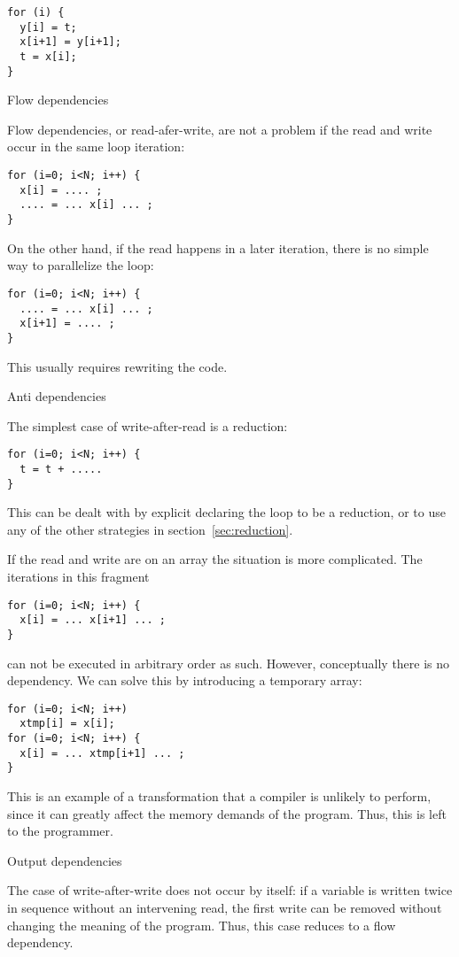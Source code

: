 \begin{verbatim}
for (i) {
  y[i] = t;
  x[i+1] = y[i+1];
  t = x[i];
}
\end{verbatim}

 {Flow dependencies}

Flow dependencies, or read-afer-write,
are not a problem if the read and write occur in the same
loop iteration:
\begin{verbatim}
for (i=0; i<N; i++) {
  x[i] = .... ;
  .... = ... x[i] ... ;
}
\end{verbatim}
On the other hand, if the read happens in a later iteration,
there is no simple way to parallelize the loop:
\begin{verbatim}
for (i=0; i<N; i++) {
  .... = ... x[i] ... ;
  x[i+1] = .... ;
}
\end{verbatim}
This usually requires rewriting the code.

 {Anti dependencies}

The simplest case of write-after-read is a reduction:
\begin{verbatim}
for (i=0; i<N; i++) {
  t = t + .....
}
\end{verbatim}
This can be dealt with by explicit declaring the loop to be a reduction,
or to use any of the other strategies in section~\ref{sec:reduction}.

If the read and write are on an array the situation is more complicated.
The iterations in this fragment
\begin{verbatim}
for (i=0; i<N; i++) {
  x[i] = ... x[i+1] ... ;
}
\end{verbatim}
can not be executed in arbitrary order as such. However, conceptually there
is no dependency. We can solve this by introducing a temporary array:
\begin{verbatim}
for (i=0; i<N; i++)
  xtmp[i] = x[i];
for (i=0; i<N; i++) {
  x[i] = ... xtmp[i+1] ... ;
}
\end{verbatim}
This is an example of a transformation that a compiler is unlikely
to perform, since it can greatly affect the memory demands of the program.
Thus, this is left to the programmer.

 {Output dependencies}

The case of write-after-write does not occur by itself:
if a variable is written twice in sequence without an intervening
read, the first write can be removed without changing the meaning of the program.
Thus, this case reduces to a flow dependency.


